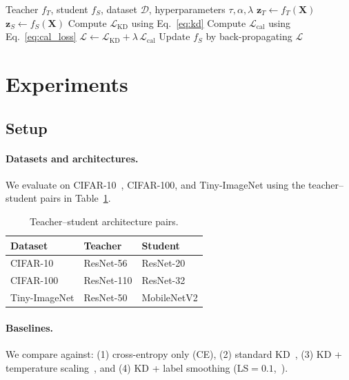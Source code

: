 \documentclass{article}
\newcommand{\cL}{\mathcal{L}}
\begin{document}
\begin{algorithm}[t]
\caption{CA-KD Training Loop}
\label{alg:cakd}
\begin{algorithmic}[1]
  \Require Teacher $f_T$, student $f_S$, dataset $\mathcal{D}$,
           hyperparameters $\tau, \alpha, \lambda$
    \State $\mathbf{z}_T \gets f_T(\mathbf{X})$ 
    \State $\mathbf{z}_S \gets f_S(\mathbf{X})$
    \State Compute $\cL_\text{KD}$ using Eq.~\eqref{eq:kd}
    \State Compute $\cL_\text{cal}$ using Eq.~\eqref{eq:cal_loss}
    \State $\cL \gets \cL_\text{KD} + \lambda\,\cL_\text{cal}$
    \State Update $f_S$ by back-propagating $\cL$
  \EndFor
\end{algorithmic}
\end{algorithm}

\section{Experiments}
\label{sec:experiments}

\subsection{Setup}

\paragraph{Datasets and architectures.}
We evaluate on CIFAR-10~\citep{krizhevsky2009learning}, CIFAR-100, and Tiny-ImageNet using the
teacher–student pairs in Table~\ref{tab:arch}.

\begin{table}[h]
\centering
\caption{Teacher–student architecture pairs.}
\label{tab:arch}
\begin{tabular}{lll}
\toprule
Dataset & Teacher & Student \\
\midrule
CIFAR-10        & ResNet-56  & ResNet-20   \\
CIFAR-100       & ResNet-110 & ResNet-32   \\
Tiny-ImageNet   & ResNet-50  & MobileNetV2 \\
\bottomrule
\end{tabular}
\end{table}

\paragraph{Baselines.}
We compare against: (1) cross-entropy only (CE), (2) standard KD~\citep{hinton2015distilling},
(3) KD + temperature scaling~\citep{guo2017calibration}, and
(4) KD + label smoothing (LS$=0.1$,~\citealt{muller2019does}).
\end{document}
